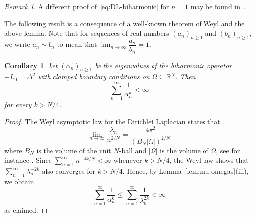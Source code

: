 \documentclass[a4paper, reqno,titlepage]{amsart}
\numberwithin{equation}{section}
\theoremstyle{plain}
\newtheorem{corollary}[theorem]{Corollary}
\theoremstyle{definition}
\theoremstyle{remark}
\newtheorem{remark}[theorem]{Remark}
\newcommand{\RR}{\mathbb{R}}
\begin{document}
\begin{remark}
  A different proof of~\eqref{eq:DL-biharmonic} for $n=1$ may be found in~\cite[Remark 4]{SS20}.
\end{remark}

The following result is a consequence of a well-known theorem of Weyl and the above lemma. Note that for sequences of real numbers $(a_n)_{n \ge 1}$ and $(b_n)_{n \ge 1}$, we write $a_n \sim b_n$ to mean that $\lim_{n \to \infty} \dfrac{a_n}{b_n} = 1$.
\begin{corollary}
  \label{cor:eig-series}
  Let $(\alpha_n)_{n \ge 1}$ be the eigenvalues of the biharmonic operator $-L_0 = \Delta^2$ with clamped boundary conditions on $\Omega \subseteq \RR^N$. Then
  \begin{equation}
    \label{eq:eig-series2}
    \sum_{n=1}^\infty \frac{1}{\alpha_n^{k}} < \infty
  \end{equation}
for every $k>N/4$.
\end{corollary}

\begin{proof}
  The Weyl asymptotic law for the Dirichlet Laplacian states that
  \begin{equation*}
    \lim_{n \to \infty} \frac{\lambda_n}{n^{2/N}}
    = \frac{4\pi^2}{(B_N |\Omega|)^{2/N}}
  \end{equation*}
  where $B_N$ is the volume of the unit $N$-ball and $|\Omega|$ is the volume of $\Omega$, see for instance \cite[p.~55]{ANPS}. Since $\sum_{n=1}^\infty n^{-4k/N}<\infty$ whenever $k>N/4$, the Weyl law shows that $\sum_{n=1}^\infty\lambda_n^{-2k}$ also converges for $k>N/4$. Hence, by Lemma~\ref{lem:mu-omegas}(iii), we obtain
  \begin{equation}
    \label{eq:eig-series-dom}
    \sum_{n=1}^\infty\frac{1}{\alpha_n^k}
    \leq\sum_{n=1}^\infty \frac{1}{\lambda_n^{2k}}<\infty
  \end{equation}
  as claimed.
\end{proof}
\end{document}
